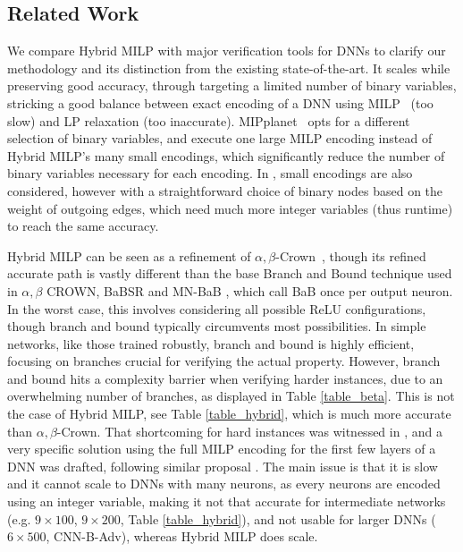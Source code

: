\subsection{Related Work} 

We compare Hybrid MILP with major verification tools for DNNs to clarify our methodology and its distinction from the existing state-of-the-art. It scales while preserving good accuracy, through targeting a limited number of binary variables, stricking a good balance between exact encoding of a DNN using MILP~\cite{MILP} (too slow) and LP relaxation (too inaccurate). MIPplanet~\cite{MIPplanet} opts for a different selection of binary variables, and execute one large MILP encoding instead of Hybrid MILP's many small encodings, which significantly reduce the number of binary variables necessary for each encoding. In \cite{DivideAndSlide}, small encodings are also considered, however with a straightforward choice of binary nodes based on the weight of outgoing edges, which need much more integer variables (thus runtime) to reach the same accuracy.

Hybrid MILP can be seen as a refinement of $\alpha,\beta$-Crown~\cite{crown}, though its refined accurate path is vastly different than the base Branch and Bound technique used in 
$\alpha,\beta$ CROWN, BaBSR \cite{BaB} and MN-BaB \cite{ferrari2022complete}, which call BaB once per output neuron. In the worst case, this involves considering all possible ReLU configurations, though branch and bound typically circumvents most possibilities. In simple networks, like those trained robustly, branch and bound is highly efficient, focusing on branches crucial for verifying the actual property. However, branch and bound hits a complexity barrier when verifying harder instances, due to an overwhelming number of branches, as displayed in Table \ref{table_beta}. This is not the case of Hybrid MILP, see Table \ref{table_hybrid}, which is much more accurate than $\alpha,\beta$-Crown.
That shortcoming for hard instances was witnessed in \cite{crown}, and a very specific solution using the full MILP encoding for the first few layers of a DNN was drafted, following similar proposal \cite{MILP2}. The main issue is that it is slow
and it cannot scale to DNNs with many neurons, as every neurons are encoded using an integer variable, making it not that accurate for intermediate networks (e.g. $9\times100$, $9\times200$, Table \ref{table_hybrid}), and not usable for larger DNNs ($6\times500$, CNN-B-Adv), whereas Hybrid MILP does scale.


